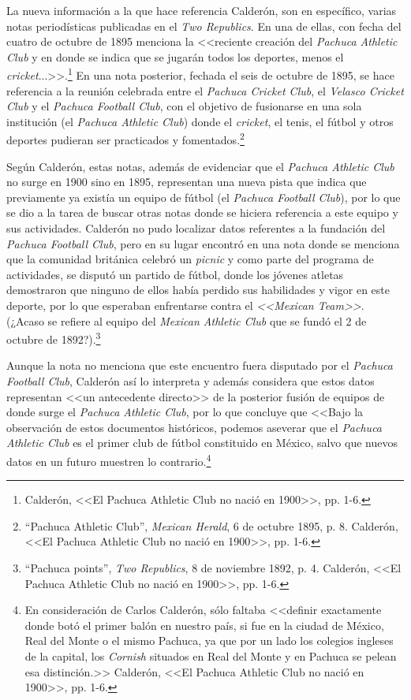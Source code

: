 \documentclass[11pt,a5paper,twoside]{book} %
\begin{document}
La nueva información a la que hace referencia Calderón, son en específico, varias notas periodísticas publicadas en el \emph{Two Republics}. En una de ellas, con fecha del cuatro de octubre de 1895 menciona la <<reciente creación del \emph{Pachuca Athletic Club} y en donde se indica que se jugarán todos los deportes, menos el \emph{cricket}...>>.\footnote{Calderón, <<El Pachuca Athletic Club no nació en 1900>>, pp. 1-6.} En una nota posterior, fechada el seis de octubre de 1895, se hace referencia a la reunión celebrada entre el \emph{Pachuca Cricket Club}, el \emph{Velasco Cricket Club} y el \emph{Pachuca Football Club}, con el objetivo de fusionarse en una sola institución (el \emph{Pachuca Athletic Club}) donde el \emph{cricket}, el tenis, el
fútbol y otros deportes pudieran ser practicados y fomentados.\footnote{``Pachuca Athletic Club'', \emph{Mexican Herald}, 6 de octubre 1895, p. 8. Calderón, <<El Pachuca Athletic Club no nació en 1900>>, pp. 1-6.}

Según Calderón, estas notas, además de evidenciar que el \emph{Pachuca Athletic Club} no surge en 1900 sino en 1895, representan una nueva pista que indica que previamente ya existía un equipo de fútbol (el \emph{Pachuca Football Club}), por lo que se dio a la tarea de buscar otras notas donde se hiciera referencia a este equipo y sus actividades. Calderón no pudo localizar datos referentes a la fundación del \emph{Pachuca Football Club}, pero en su lugar encontró
en una nota donde se menciona que la comunidad británica celebró un \emph{picnic} y como parte del programa de actividades, se disputó un partido de fútbol, donde los jóvenes atletas demostraron que ninguno de ellos había perdido sus habilidades y vigor en este deporte, por lo que esperaban enfrentarse contra el \emph{<<Mexican Team>>}. (¿Acaso se refiere al equipo del \emph{Mexican Athletic Club} que se fundó el {2 de octubre de 1892?}).\footnote{``Pachuca points'', \emph{Two Republics}, 8 de noviembre 1892, p. 4. Calderón, <<El Pachuca Athletic Club no nació en 1900>>, pp. 1-6.}

Aunque la nota no menciona que este encuentro fuera disputado por el \emph{Pachuca
Football Club}, Calderón así lo interpreta y además considera que estos datos representan <<un antecedente directo>> de la posterior fusión de equipos de donde surge el \emph{Pachuca Athletic Club}, por lo que concluye que <<Bajo la observación de estos documentos históricos, podemos aseverar que el \emph{Pachuca Athletic Club} es el primer club de fútbol constituido en México, salvo que nuevos datos en un futuro muestren lo contrario.\footnote{En consideración de Carlos Calderón, sólo faltaba <<definir exactamente donde botó el primer balón en
nuestro país, si fue en la ciudad de México, Real del Monte o el mismo Pachuca, ya que por un lado los colegios ingleses de la capital, los \emph{Cornish} situados en Real del Monte y en Pachuca se pelean esa distinción.>> Calderón, <<El Pachuca Athletic Club no nació en 1900>>, pp. 1-6.}
\end{document}
